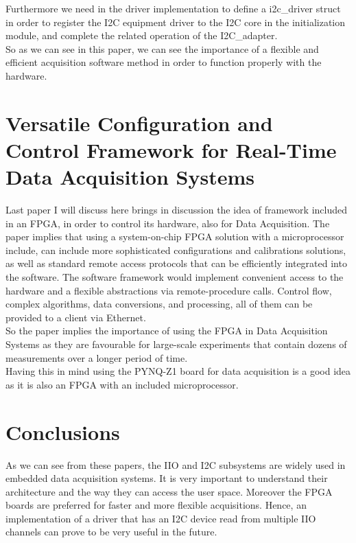 \documentclass[l2pt, letterpaper]{article}
\begin{document}
Furthermore we need in the driver implementation to define a i2c\_driver struct in
order to register the I2C equipment driver to the I2C core in the initialization
module, and complete the related operation of the I2C\_adapter. \\

So as we can see in this paper, we can see the importance of a flexible and
efficient acquisition software method in order to function properly with the
hardware.

\section{Versatile Configuration and Control Framework for Real-Time Data Acquisition Systems}

Last paper I will discuss here brings in discussion the idea of framework included
in an FPGA, in order to control its hardware, also for Data Acquisition. The paper
implies that using a system-on-chip FPGA solution with a microprocessor include,
can include more sophisticated configurations and calibrations solutions, as well
as standard remote access protocols that can be efficiently integrated into the
software. The software framework would implement convenient access to the
hardware and a flexible abstractions via remote-procedure calls. Control flow,
complex algorithms, data conversions, and processing, all of them can be
provided to a client via Ethernet. \\

So the paper implies the importance of using the FPGA in Data Acquisition
Systems as they are favourable for large-scale experiments that contain dozens
of measurements over a longer period of time. \\

Having this in mind using the PYNQ-Z1 board for data acquisition is a good idea
as it is also an FPGA with an included microprocessor.

\section{Conclusions}

As we can see from these papers, the IIO and I2C subsystems are widely used in
embedded data acquisition systems. It is very important to understand their
architecture and the way they can access the user space. Moreover the FPGA
boards are preferred for faster and more flexible acquisitions. Hence, an
implementation of a driver that has an I2C device read from multiple IIO
channels can prove to be very useful in the future.
\end{document}
